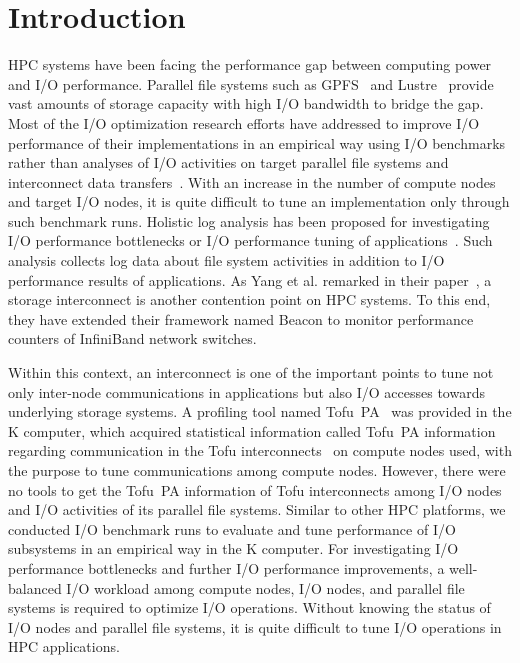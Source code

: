 \documentclass{jhps}
\begin{document}
\section{Introduction}
\label{sec:INTRO}

HPC systems have been facing the performance gap between computing power and I/O performance.
Parallel file systems such as GPFS~\cite{gpfs:usenix02} and Lustre~\cite{lustre:web} provide
vast amounts of storage capacity with high I/O bandwidth to bridge the gap.
Most of the I/O optimization research efforts have addressed to improve
I/O performance of their implementations in an empirical way using I/O benchmarks
rather than analyses of I/O activities on target parallel file systems
and interconnect
data transfers~\cite{behzad:sc13,bhimji:cug16,tessier:com-hpc16,vazhkudai:sc18,oral:sc19}.
With an increase in the number of compute nodes and target I/O nodes,
it is quite difficult to tune an implementation only through such benchmark runs.
Holistic log analysis has been proposed for investigating I/O performance bottlenecks
or I/O performance tuning
of applications~\cite{lockwood:cug18,wang:cluster18,yang:nsdi2019}.
Such analysis collects log data about file system activities in addition to
I/O performance results of applications.
As Yang et al. remarked in their paper~\cite{yang:nsdi2019},
a storage interconnect is another contention point on HPC systems.
To this end, they have extended their framework named Beacon
to monitor performance counters of InfiniBand network switches.

Within this context, an interconnect is one of the important points
to tune not only inter-node communications in applications
but also I/O accesses towards underlying storage systems.
A profiling tool named Tofu~PA~\cite{profiler:fujitsu-tech-si}
was provided in the K computer, which acquired statistical information
called Tofu~PA information regarding communication
in the Tofu interconnects~\cite{tofu:micro2012} on compute nodes used,
with the purpose to tune communications among compute nodes.
However, there were no tools to get the Tofu~PA information of Tofu interconnects
among I/O nodes and I/O activities of its parallel file systems.
Similar to other HPC platforms, we conducted I/O benchmark runs
to evaluate and tune performance of I/O subsystems in an empirical way
in the K computer.
For investigating I/O performance bottlenecks and further I/O performance improvements,
a well-balanced I/O workload among compute nodes, I/O nodes, and parallel file systems
is required to optimize I/O operations.
Without knowing the status of I/O nodes and parallel file systems,
it is quite difficult to tune I/O operations in HPC applications.
\end{document}
